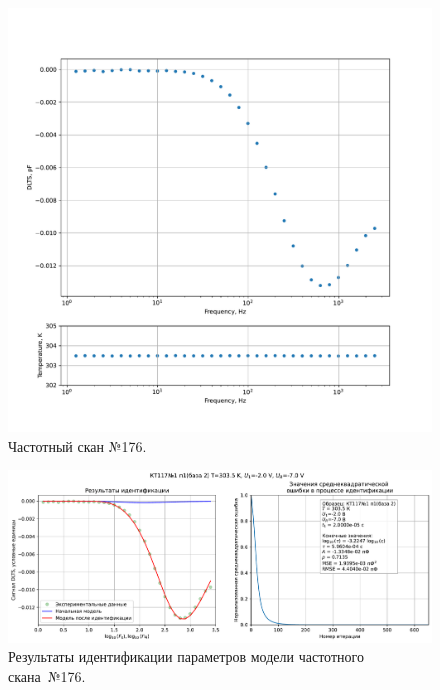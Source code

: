 \begin{figure}[!ht]
    \centering
    \includegraphics[width=1\textwidth]{../plots/КТ117№1_п1(база 2)_2500Гц-1Гц_1пФ_+30С_-2В-7В_200мВ_20мкс_шаг_0,1.pdf}
    \caption{Частотный скан №176.}
    \label{pic:frequency_scan_176}
\end{figure}

\begin{figure}[!ht]
    \centering
    \includegraphics[width=1\textwidth]{../plots/КТ117№1_п1(база 2)_2500Гц-1Гц_1пФ_+30С_-2В-7В_200мВ_20мкс_шаг_0,1_model.pdf}
    \caption{Результаты идентификации параметров модели частотного скана~№176.}
    \label{pic:frequency_scan_model176}
\end{figure}

\pagebreak


